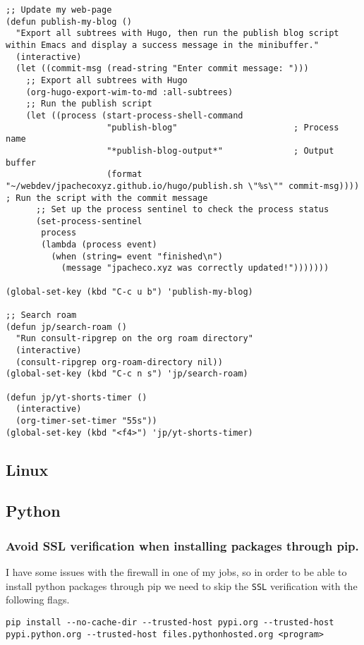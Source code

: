 \documentclass[11pt]{article}
\begin{document}
\begin{verbatim}
;; Update my web-page
(defun publish-my-blog ()
  "Export all subtrees with Hugo, then run the publish blog script within Emacs and display a success message in the minibuffer."
  (interactive)
  (let ((commit-msg (read-string "Enter commit message: ")))
    ;; Export all subtrees with Hugo
    (org-hugo-export-wim-to-md :all-subtrees)
    ;; Run the publish script
    (let ((process (start-process-shell-command
                    "publish-blog"                       ; Process name
                    "*publish-blog-output*"              ; Output buffer
                    (format "~/webdev/jpachecoxyz.github.io/hugo/publish.sh \"%s\"" commit-msg))))  ; Run the script with the commit message
      ;; Set up the process sentinel to check the process status
      (set-process-sentinel
       process
       (lambda (process event)
         (when (string= event "finished\n")
           (message "jpacheco.xyz was correctly updated!")))))))

(global-set-key (kbd "C-c u b") 'publish-my-blog)

;; Search roam
(defun jp/search-roam ()
  "Run consult-ripgrep on the org roam directory"
  (interactive)
  (consult-ripgrep org-roam-directory nil))
(global-set-key (kbd "C-c n s") 'jp/search-roam)

(defun jp/yt-shorts-timer ()
  (interactive)
  (org-timer-set-timer "55s"))
(global-set-key (kbd "<f4>") 'jp/yt-shorts-timer)
\end{verbatim}
\subsection{Linux}
\label{sec:org5a1a1d2}
\subsection{Python}
\label{sec:org7f72f91}
\subsubsection{Avoid SSL verification when installing packages through pip.}
\label{sec:orgb1c9e50}
I have some issues with the firewall in one of my jobs, so in order to be able to install python packages through pip we need to skip the \texttt{SSL} verification with the following flags.
\begin{verbatim}
pip install --no-cache-dir --trusted-host pypi.org --trusted-host pypi.python.org --trusted-host files.pythonhosted.org <program>
\end{verbatim}
\end{document}
